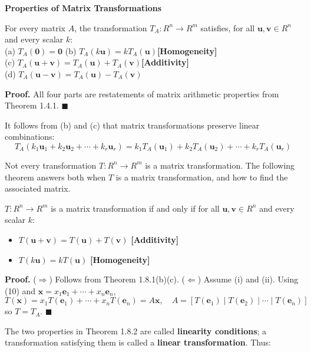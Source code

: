 \documentclass{article}
\newcommand{\redheading}[1]{{\vspace{2mm}\noindent\Large\bfseries\color{red!55!black} #1\par}\vspace{2mm}}
\theoremstyle{mystyle}
\begin{document}
\redheading{Properties of Matrix Transformations}

\begin{tcolorbox}[colback=red!4, colframe=red!60!black, title=Theorem 1.8.1, boxrule=0.5mm, arc=3mm]
For every matrix $A$, the transformation $T_A:R^n\to R^m$ satisfies, for all $\mathbf{u},\mathbf{v}\in R^n$ and every scalar $k$:\\
(a) $T_A(\mathbf{0})=\mathbf{0}$\qquad
(b) $T_A(k\mathbf{u})=kT_A(\mathbf{u})$\quad\textbf{[Homogeneity]}\\
(c) $T_A(\mathbf{u}+\mathbf{v})=T_A(\mathbf{u})+T_A(\mathbf{v})$\quad\textbf{[Additivity]}\\
(d) $T_A(\mathbf{u}-\mathbf{v})=T_A(\mathbf{u})-T_A(\mathbf{v})$
\end{tcolorbox}
\textbf{Proof.} All four parts are restatements of matrix arithmetic properties from Theorem 1.4.1. $\blacksquare$

It follows from (b) and (c) that matrix transformations preserve linear combinations:
\[
T_A(k_1\mathbf{u}_1+k_2\mathbf{u}_2+\cdots+k_r\mathbf{u}_r)=k_1T_A(\mathbf{u}_1)+k_2T_A(\mathbf{u}_2)+\cdots+k_rT_A(\mathbf{u}_r) \tag{10}
\]

Not every transformation $T:R^n\to R^m$ is a matrix transformation. The following theorem answers both when $T$ is a matrix transformation, and how to find the associated matrix.

\begin{tcolorbox}[colback=red!4, colframe=red!60!black, title=Theorem 1.8.2, boxrule=0.5mm, arc=3mm]
$T:R^n\to R^m$ is a matrix transformation if and only if for all $\mathbf{u},\mathbf{v}\in R^n$ and every scalar $k$:
\begin{itemize}\setlength\itemsep{0pt}
\item[(i)] $T(\mathbf{u}+\mathbf{v})=T(\mathbf{u})+T(\mathbf{v})$ \quad\textbf{[Additivity]}
\item[(ii)] $T(k\mathbf{u})=kT(\mathbf{u})$ \quad\textbf{[Homogeneity]}
\end{itemize}
\end{tcolorbox}
\textbf{Proof.} ($\Rightarrow$) Follows from Theorem 1.8.1(b)(c). ($\Leftarrow$) Assume (i) and (ii). Using (10) and $\mathbf{x}=x_1\mathbf{e}_1+\cdots+x_n\mathbf{e}_n$,
\[
T(\mathbf{x})=x_1T(\mathbf{e}_1)+\cdots+x_nT(\mathbf{e}_n)=A\mathbf{x},\quad A=[T(\mathbf{e}_1)\mid T(\mathbf{e}_2)\mid\cdots\mid T(\mathbf{e}_n)] \tag{13}
\]
so $T=T_A$. $\blacksquare$

The two properties in Theorem 1.8.2 are called \textbf{linearity conditions}; a transformation satisfying them is called a \textbf{linear transformation}. Thus:
\end{document}
